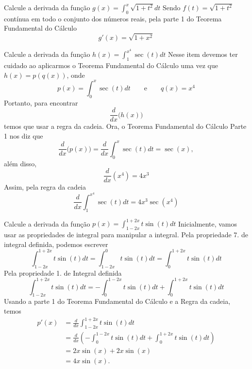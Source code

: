\begin{example}
  Calcule a derivada da função \(g(x)=\int_0^x \sqrt{1+t^2} dt\)
  \solution
  Sendo $f(t)= \sqrt{1+t^2}$ contínua em todo o conjunto dos números reais,
  pela parte 1 do Teorema Fundamental do Cálculo
  \[
    g'(x)=\sqrt{1+x^2}
  \]
\end{example}

\begin{example}
  Calcule a derivada da função \(h(x)=\int_1^{x^4} \sec(t)dt\)
  \solution
  Nesse item devemos ter cuidado ao aplicarmos o Teorema Fundamental do
  Cálculo uma vez que $h(x)=p(q(x))$, onde
  \[
    p(x)=\int_0^x \sec(t)dt
    \qquad\text{e}\qquad
    q(x)= x^4
  \]
  Portanto, para encontrar
  \[
    \frac{d}{dx}\big(h(x)\big)
  \]
  temos que usar a regra da
  cadeia. Ora, o Teorema Fundamental do Cálculo Parte 1 nos diz que
  \[
    \frac{d}{dx}\big(p(x)\big)= \frac{d}{dx} \int_0^x \sec(t)dt= \sec(x),
  \]
  além disso,
  \[
  \frac{d}{dx}\left(x^4\right) = 4x^3
  \]
  Assim, pela regra da cadeia
  \[
    \frac{d}{dx}\int_1^{x^4} \sec(t)dt= 4x^3\sec\left(x^4\right)
  \]
\end{example}

\begin{example}
  Calcule a derivada da função \(p(x)= \int_{1-2x}^{1+2x} t\sin(t)dt\)
  \solution
  Inicialmente, vamos usar as propriedades de integral para manipular a
  integral. Pela propriedade 7. de integral definida, podemos escrever
  \[
      \int_{1-2x}^{1+2x} t\sin(t)dt
      = \int_{1-2x}^{0} t\sin(t)dt
      = \int_{0}^{1+2x} t\sin(t)dt
  \]
  Pela propriedade 1. de Integral definida
  \[
      \int_{1-2x}^{1+2x} t\sin(t)dt
      = - \int_{0}^{1-2x} t\sin(t)dt
      + \int_{0}^{1+2x} t\sin(t)dt
  \]
  Usando a parte 1 do Teorema Fundamental do Cálculo e a Regra da cadeia,
  temos
  \begin{align*}
    p'(x)
    & = \frac{d}{dx} \int_{1-2x}^{1+2x} t\sin(t)dt \\
    & = \frac{d}{dx} \left(
    - \int_{0}^{1-2x} t\sin(t)dt
    + \int_{0}^{1+2x} t\sin(t)dt
    \right) \\
    & = 2x \sin(x)+2x \sin(x) \\
    & = 4x\sin(x).
  \end{align*}

\end{example}

